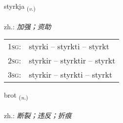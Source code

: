 \documentclass[frontgrid, backgrid]{flacards}\usepackage[]{graphicx}\usepackage[]{xcolor}
\begin{document}
\renewcommand{\blhead}{\vskip5pt {\small\bfseries\footnotesize Sagnorð | 动词 }}
\renewcommand{\bcfoot}{\vskip5pt \hspace{2pt}{\small\bfseries\footnotesize 1K}}


{styrkja \small{\textsubscript{(\textit{v.})}} \\[1ex] %
\textphonetic{[stɪr̥ca]} \\
zh.: \emph{加强；资助} \\  [2ex]
\renewcommand*{\arraystretch}{0.8}
\begin{tabular}{p{1cm}l}
\textsc{1sg}: & styrki -- styrkti -- styrkt \\ 
\textsc{2sg}: & styrkir -- styrktir -- styrkt \\ 
\textsc{3sg}: & styrkir -- styrkti -- styrkt \\ 
\end{tabular}
}

\renewcommand{\flhead}{\vskip5pt \fboxsep=0pt {\small\bfseries\footnotesize Nafnorð | 名词}}
\renewcommand{\fcfoot}{\vskip5pt \fboxsep=0pt \hspace{2pt}{\small\bfseries\footnotesize 1K}}

\renewcommand{\blhead}{\vskip5pt {\small\bfseries\footnotesize Nafnorð | 名词 }}
\renewcommand{\bcfoot}{\vskip5pt \hspace{2pt}{\small\bfseries\footnotesize 1K}}


{brot \small{\textsubscript{(\textit{n.})}} \\[1ex] %
\textphonetic{[prɔːt]} \\
zh.: \emph{断裂；违反；折痕} \\  [2ex]
\renewcommand*{\arraystretch}{0.8}
}

\renewcommand{\flhead}{\vskip5pt \fboxsep=0pt {\small\bfseries\footnotesize Sagnorð | 动词}}
\renewcommand{\fcfoot}{\vskip5pt \fboxsep=0pt \hspace{2pt}{\small\bfseries\footnotesize 1K}}
\end{document}
